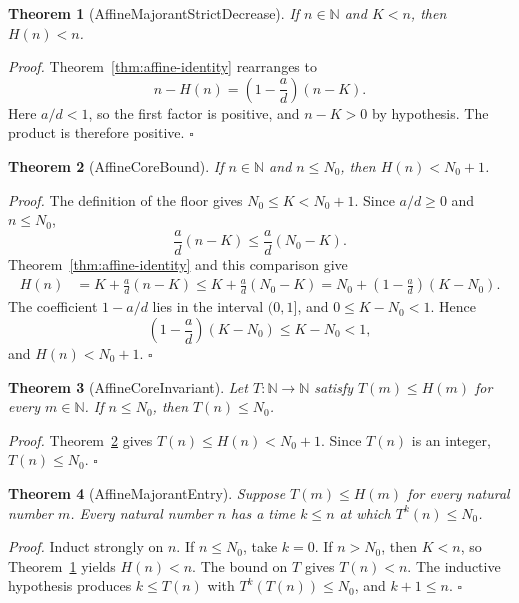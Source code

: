 \documentclass[11pt,letterpaper]{article}
\newcommand{\N}{\mathbb{N}}
\newcommand{\Map}[3]{#1 \colon #2 \to #3}
\newtheorem{theorem}{Theorem}
\newenvironment{proof}{\noindent\textit{Proof.}}{\hfill\(\square\)}
\begin{document}
\begin{theorem}[AffineMajorantStrictDecrease]
\label{thm:affine-decrease}
If \(n\in\N\) and \(K<n\), then \(H(n)<n\).
\end{theorem}

\begin{proof}
Theorem~\ref{thm:affine-identity} rearranges to
\[
n-H(n)=\left(1-\frac{a}{d}\right)(n-K).
\]
Here \(a/d<1\), so the first factor is positive, and \(n-K>0\) by hypothesis. The product is therefore positive.
\end{proof}

\begin{theorem}[AffineCoreBound]
\label{thm:affine-core}
If \(n\in\N\) and \(n\le N_{0}\), then \(H(n)<N_{0}+1\).
\end{theorem}

\begin{proof}
The definition of the floor gives \(N_{0}\le K<N_{0}+1\). Since \(a/d\ge 0\) and \(n\le N_{0}\),
\[
\frac{a}{d}(n-K)\le \frac{a}{d}(N_{0}-K).
\]
Theorem~\ref{thm:affine-identity} and this comparison give
\begin{align*}
H(n)
&=K+\frac{a}{d}(n-K)
\le K+\frac{a}{d}(N_{0}-K)
=N_{0}+\left(1-\frac{a}{d}\right)(K-N_{0}).
\end{align*}
The coefficient \(1-a/d\) lies in the interval \((0,1]\), and \(0\le K-N_{0}<1\). Hence
\[
\left(1-\frac{a}{d}\right)(K-N_{0})\le K-N_{0}<1,
\]
and \(H(n)<N_{0}+1\).
\end{proof}

\begin{theorem}[AffineCoreInvariant]
\label{thm:affine-invariant}
Let \(\Map{T}{\N}{\N}\) satisfy \(T(m)\le H(m)\) for every \(m\in\N\). If \(n\le N_{0}\), then \(T(n)\le N_{0}\).
\end{theorem}

\begin{proof}
Theorem~\ref{thm:affine-core} gives \(T(n)\le H(n)<N_{0}+1\). Since \(T(n)\) is an integer, \(T(n)\le N_{0}\).
\end{proof}

\begin{theorem}[AffineMajorantEntry]
\label{thm:affine-entry}
Suppose \(T(m)\le H(m)\) for every natural number \(m\). Every natural number \(n\) has a time \(k\le n\) at which \(T^{k}(n)\le N_{0}\).
\end{theorem}

\begin{proof}
Induct strongly on \(n\). If \(n\le N_{0}\), take \(k=0\). If \(n>N_{0}\), then \(K<n\), so Theorem~\ref{thm:affine-decrease} yields \(H(n)<n\). The bound on \(T\) gives \(T(n)<n\). The inductive hypothesis produces \(k\le T(n)\) with \(T^{k}(T(n))\le N_{0}\), and \(k+1\le n\).
\end{proof}
\end{document}
